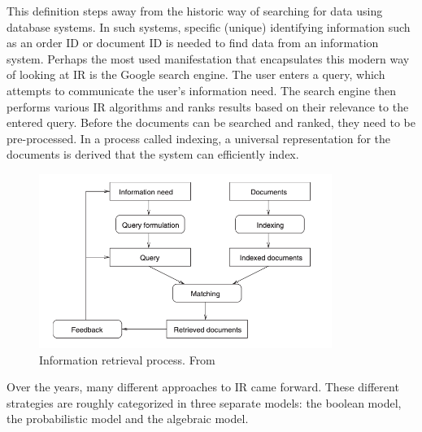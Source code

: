 \documentclass[twoside]{uva-inf-bachelor-thesis}
\begin{document}
\cite{manning08IR}

This definition steps away from the historic way of searching for data using database systems. In such systems, specific (unique) identifying information such as an order ID or document ID is needed to find data from an information system. Perhaps the most used manifestation that encapsulates this modern way of looking at IR is the Google search engine. The user enters a query, which attempts to communicate the user's information need. The search engine then performs various IR algorithms and ranks results based on their relevance to the entered query. Before the documents can be searched and ranked, they need to be pre-processed. In a process called indexing, a universal representation for the documents is derived that the system can efficiently index.

\begin{figure}[h]
    \centering
    \includegraphics[width=0.85\textwidth]{images/irDiagram.png}
    \caption{Information retrieval process. From \cite{goker2009information}}
    \label{fig:ir}
\end{figure}

Over the years, many different approaches to IR came forward. These different strategies are roughly categorized in three separate models: the boolean model, the probabilistic model and the algebraic model. \cite{goker2009information}
\end{document}
